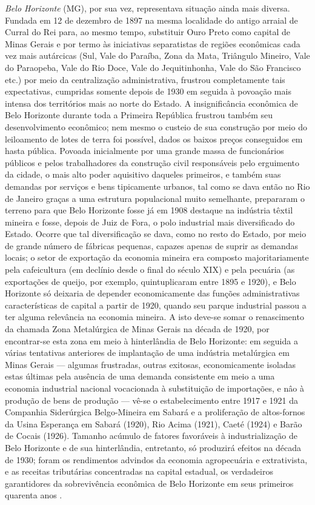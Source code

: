 \textit{Belo Horizonte} (MG), por sua vez, representava situação ainda mais diversa. Fundada em 12 de dezembro de 1897 na mesma localidade do antigo arraial de Curral do Rei para, ao mesmo tempo, substituir Ouro Preto como capital de Minas Gerais e por termo às iniciativas separatistas de regiões econômicas cada vez mais autárcicas (Sul, Vale do Paraíba, Zona da Mata, Triângulo Mineiro, Vale do Paraopeba, Vale do Rio Doce, Vale do Jequitinhonha, Vale do São Francisco etc.) por meio da centralização administrativa, frustrou completamente tais expectativas, cumpridas somente depois de 1930 em seguida à povoação mais intensa dos territórios mais ao norte do Estado. A insignificância econômica de Belo Horizonte durante toda a Primeira República frustrou também seu desenvolvimento econômico; nem mesmo o custeio de sua construção por meio do leiloamento de lotes de terra foi possível, dados os baixos preços conseguidos em hasta pública. Povoada inicialmente por uma grande massa de funcionários públicos e pelos trabalhadores da construção civil responsáveis pelo erguimento da cidade, o mais alto poder aquisitivo daqueles primeiros, e também suas demandas por serviços e bens tipicamente urbanos, tal como se dava então no Rio de Janeiro graças a uma estrutura populacional muito semelhante, prepararam o terreno para que Belo Horizonte fosse já em 1908 destaque na indústria têxtil mineira e fosse, depois de Juiz de Fora, o polo industrial mais diversificado do Estado. Ocorre que tal diversificação se dava, como no resto do Estado, por meio de grande número de fábricas pequenas, capazes apenas de suprir as demandas locais; o setor de exportação da economia mineira era composto majoritariamente pela cafeicultura (em declínio desde o final do século XIX) e pela pecuária (as exportações de queijo, por exemplo, quintuplicaram entre 1895 e 1920), e Belo Horizonte só deixaria de depender economicamente das funções administrativas características de capital a partir de 1920, quando seu parque industrial passou a ter alguma relevância na economia mineira. A isto deve-se somar o renascimento da chamada Zona Metalúrgica de Minas Gerais na década de 1920, por encontrar-se esta zona em meio à hinterlândia de Belo Horizonte: em seguida a várias tentativas anteriores de implantação de uma indústria metalúrgica em Minas Gerais --- algumas frustradas, outras exitosas, economicamente isoladas estas últimas pela ausência de uma demanda consistente em meio a uma economia industrial nacional vocacionada à substituição de importações, e nâo à produção de bens de produção --- vê-se o estabelecimento entre 1917 e 1921 da Companhia Siderúrgica Belgo-Mineira em Sabará e a proliferação de altos-fornos da Usina Esperança em Sabará (1920), Rio Acima (1921), Caeté (1924) e Barão de Cocais (1926). Tamanho acúmulo de fatores favoráveis à industrialização de Belo Horizonte e de sua hinterlândia, entretanto, só produzirá efeitos na década de 1930; foram os rendimentos advindos da economia agropecuária e extrativista, e as receitas tributárias concentradas na capital estadual, os verdadeiros garantidores da sobrevivência econômica de Belo Horizonte em seus primeiros quarenta anos \cite[p.199-257]{singer_evourb_1968}.

